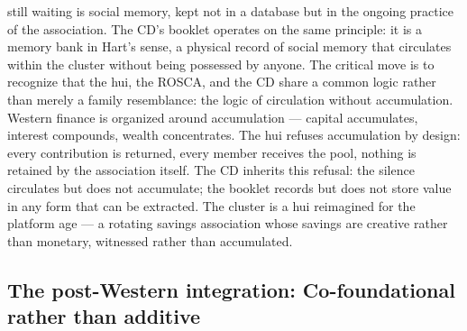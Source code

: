 still waiting is social memory, kept not in a database but in the ongoing practice of the association. The CD’s booklet operates on the same principle: it is a memory bank in Hart’s sense, a physical record of social memory that circulates within the cluster without being possessed by anyone. The critical move is to recognize that the hui, the ROSCA, and the CD share a common logic rather than merely a family resemblance: the logic of circulation without accumulation. Western finance is organized around accumulation — capital accumulates, interest compounds, wealth concentrates. The hui refuses accumulation by design: every contribution is returned, every member receives the pool, nothing is retained by the association itself. The CD inherits this refusal: the silence circulates but does not accumulate; the booklet records but does not store value in any form that can be extracted. The cluster is a hui reimagined for the platform age — a rotating savings association whose savings are creative rather than monetary, witnessed rather than accumulated.

\subsection{The post-Western integration: Co-foundational rather than additive}

